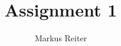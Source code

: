 \documentclass{article}
\title{Assignment 1}
\author{Markus Reiter}
\begin{document}
\maketitle

\section{}

\section{}

\section{}
\end{document}
